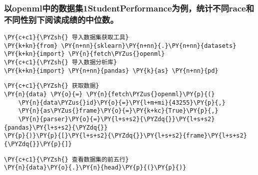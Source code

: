     \hypertarget{ux4ee5openmlux4e2dux7684ux6570ux636eux96c61studentperformanceux4e3aux4f8bux7edfux8ba1ux4e0dux540craceux548cux4e0dux540cux6027ux522bux4e0bux9605ux8bfbux6210ux7ee9ux7684ux4e2dux4f4dux6570}{%
\subsubsection{以openml中的数据集1StudentPerformance为例，统计不同race和不同性别下阅读成绩的中位数。}\label{ux4ee5openmlux4e2dux7684ux6570ux636eux96c61studentperformanceux4e3aux4f8bux7edfux8ba1ux4e0dux540craceux548cux4e0dux540cux6027ux522bux4e0bux9605ux8bfbux6210ux7ee9ux7684ux4e2dux4f4dux6570}}

    \begin{tcolorbox}[breakable, size=fbox, boxrule=1pt, pad at break*=1mm,colback=cellbackground, colframe=cellborder]
\begin{Verbatim}[commandchars=\\\{\}]
\PY{c+c1}{\PYZsh{} 导入数据集获取工具}
\PY{k+kn}{from} \PY{n+nn}{sklearn}\PY{n+nn}{.}\PY{n+nn}{datasets} \PY{k+kn}{import} \PY{n}{fetch\PYZus{}openml}
\PY{c+c1}{\PYZsh{} 导入数据分析库}
\PY{k+kn}{import} \PY{n+nn}{pandas} \PY{k}{as} \PY{n+nn}{pd}
\end{Verbatim}
\end{tcolorbox}

    \begin{tcolorbox}[breakable, size=fbox, boxrule=1pt, pad at break*=1mm,colback=cellbackground, colframe=cellborder]
\begin{Verbatim}[commandchars=\\\{\}]
\PY{c+c1}{\PYZsh{} 获取数据}
\PY{n}{data} \PY{o}{=} \PY{n}{fetch\PYZus{}openml}\PY{p}{(}
    \PY{n}{data\PYZus{}id}\PY{o}{=}\PY{l+m+mi}{43255}\PY{p}{,}
    \PY{n}{as\PYZus{}frame}\PY{o}{=}\PY{k+kc}{True}\PY{p}{,}
    \PY{n}{parser}\PY{o}{=}\PY{l+s+s2}{\PYZdq{}}\PY{l+s+s2}{pandas}\PY{l+s+s2}{\PYZdq{}}
\PY{p}{)}\PY{p}{[}\PY{l+s+s2}{\PYZdq{}}\PY{l+s+s2}{frame}\PY{l+s+s2}{\PYZdq{}}\PY{p}{]}
\end{Verbatim}
\end{tcolorbox}

    \begin{tcolorbox}[breakable, size=fbox, boxrule=1pt, pad at break*=1mm,colback=cellbackground, colframe=cellborder]
\begin{Verbatim}[commandchars=\\\{\}]
\PY{c+c1}{\PYZsh{} 查看数据集的前五行}
\PY{n}{data}\PY{o}{.}\PY{n}{head}\PY{p}{(}\PY{p}{)}
\end{Verbatim}
\end{tcolorbox}

